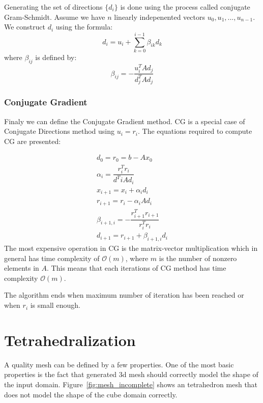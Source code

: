 \documentclass[en]{minipw} %
\begin{document}
Generating the set of directions $\{ d_i \}$ is done using the process called conjugate Gram-Schmidt. Assume we have $n$ linearly indepenented vectors $u_0, u_1, ..., u_{n-1}$. We construct $d_i$ using the formula:
\begin{equation}
d_{i} = u_{i} + \sum^{i-1}_{k=0} \beta_{ik} d_{k}
\end{equation}
where $\beta_{ij}$ is defined by:
\begin{equation}
\beta_{ij} = - \dfrac{u^{T}_i A d_{j}}{d^{T}_{j}A d_{j}}
\end{equation}

\subsection{Conjugate Gradient}
Finaly we can define the Conjugate Gradient method. CG is a special case of Conjugate Directions method using $u_i = r_i$. The equations required to compute CG are presented:

\begin{equation}
\begin{aligned}
d_0 = r_0 = b - Ax_0
\\
\alpha_i = \dfrac{r^{T}_{i} r_{i}}{d^{T}{i} A d_{i}}
\\
x_{i+1} = x_{i} + \alpha_{i}d_{i}
\\
r_{i+1} = r_{i} - \alpha_{i}Ad_{i}
\\
\beta_{i+1,i} = - \dfrac{r^{T}_{i+1} r_{i+1}}{r^{T}_{i} r_{i}}
\\
d_{i+1} = r_{i+1} + \beta_{i+1,i} d_{i}
\end{aligned}
\end{equation}
The most expensive operation in CG is the matrix-vector multiplication which in general has time complexity of $\mathcal{O}(m)$, where $m$ is the number of nonzero elements in $A$. This means that each iterations of CG method has time complexity $\mathcal{O}(m)$.

The algorithm ends when maximum number of iteration has been reached or when $r_i$ is small enough.

\chapter{Tetrahedralization}
\label{chap:Tetrahedralization}
A quality mesh can be defined by a few properties.
One of the most basic properties is the fact that generated 3d mesh should correctly model the shape of the input domain. Figure~\ref{fig:mesh_incomplete} shows an tetrahedron mesh that does not model the shape of the cube domain correctly.
\end{document}
